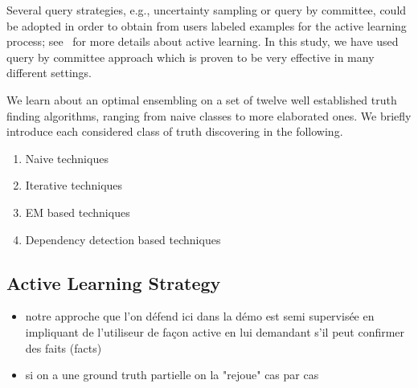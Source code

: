 Several query strategies, e.g., uncertainty sampling or query by committee, could be adopted in order to obtain from users labeled
examples for the active learning process; see~\cite{burr12} for more details about active learning. In this study, we have used query 
by committee approach which is proven to be very effective in many different settings.



We learn about an optimal ensembling on a set of twelve well established truth finding algorithms, ranging from naive classes to more elaborated
ones. We briefly introduce each considered class of truth discovering in the following.
\begin{enumerate}
 \item Naive techniques
 \item Iterative techniques
 \item EM based techniques
 \item Dependency detection based techniques
\end{enumerate}



\subsection{Active Learning Strategy}
\begin{itemize}
 \item notre approche que l'on défend ici dans la démo est  semi supervisée en impliquant de l'utiliseur de façon active
en lui demandant s'il peut confirmer des faits (facts)
\item si on a une ground truth partielle on la "rejoue" cas par cas
\end{itemize}

